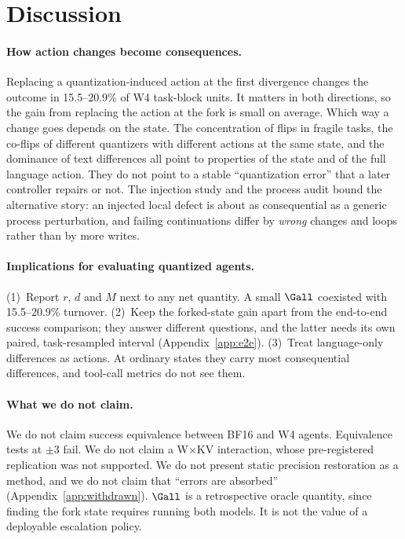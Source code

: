 \section{Discussion}
\label{sec:discussion}

\paragraph{How action changes become consequences.} Replacing a quantization-induced action at the first divergence changes the outcome in 15.5--20.9\% of W4 task-block units. %
 It matters in both directions, so the gain from replacing the action at the fork is small on average. Which way a change goes depends on the state. The concentration of flips in fragile tasks, the co-flips of different quantizers with different actions at the same state, and the dominance of text differences all point to properties of the state and of the full language action. They do not point to a stable ``quantization error'' that a later controller repairs or not. The injection study and the process audit bound the alternative story: an injected local defect is about as consequential as a generic process perturbation, and failing continuations differ by \emph{wrong} changes and loops rather than by more writes.

\paragraph{Implications for evaluating quantized agents.} (1)~Report $r$, $d$ and $M$ next to any net quantity. A small $\Gall$ coexisted with 15.5--20.9\% turnover. %
(2)~Keep the forked-state gain apart from the end-to-end success comparison; they answer different questions, and the latter needs its own paired, task-resampled interval (Appendix~\ref{app:e2e}). (3)~Treat language-only differences as actions. At ordinary states they carry most consequential differences, and tool-call metrics do not see them.

\paragraph{What we do not claim.} We do not claim success equivalence between BF16 and W4 agents. Equivalence tests at $\pm$3\pp{} fail. %
We do not claim a W$\times$KV interaction, whose pre-registered replication was not supported. We do not present static precision restoration as a method, and we do not claim that ``errors are absorbed'' (Appendix~\ref{app:withdrawn}). $\Gall$ is a retrospective oracle quantity, since finding the fork state requires running both models. It is not the value of a deployable escalation policy.
